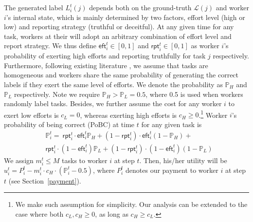 The generated label $L^{t}_{i}(j)$ depends both on the ground-truth $\mathcal{L}(j)$ and worker $i$'s internal state, which is mainly determined by two factors, effort level (high or low) and reporting strategy (truthful or deceitful).
At any given time for any task, workers at their will adopt an arbitrary combination of effort level and report strategy. We thus define $\textsf{eft}^{t}_i\in[0,1]$ and $\textsf{rpt}^{t}_i\in[0,1]$ as worker $i$'s probability of exerting high efforts and reporting truthfully for task $j$ %
respectively. Furthermore, following existing literature \citet{dasgupta2013crowdsourced,liu2017sequential}, we assume that tasks are homogeneous and workers share the same probability of generating the correct labels if they exert the same level of efforts. We denote the probability as $\mathbb{P}_{H}$ and $\mathbb{P}_{L}$ respectively. Note we require $\mathbb{P}_{H} > \mathbb{P}_{L} = 0.5$, where 0.5 is used when workers randomly label tasks.
Besides, we further assume the cost for any worker $i$ to exert low efforts is $c_{L} = 0$, whereas exerting high efforts is $c_{H} \geq 0$.\footnote{We make such assumption for simplicity. Our analysis can be extended to the case where both $c_{L},  c_{H} \geq 0$, as long as $c_{H} \geq c_{L}$.}
Worker $i$'s probability of being correct (PoBC) at time $t$ for any given task is 
\begin{equation}
\begin{split}
&\mathbb{P}^{t}_i  = ~\textsf{rpt}^{t}_i \cdot\textsf{eft}^{t}_i \mathbb{P}_{H}+ (1-\textsf{rpt}^{t}_i)\cdot \textsf{eft}^{t}_i (1-\mathbb{P}_{ H})+\\
&\textsf{rpt}^{t}_i \cdot(1-\textsf{eft}^{t}_i) \mathbb{P}_{L}+(1-\textsf{rpt}^{t}_i) \cdot(1-\textsf{eft}^{t}_i) (1-\mathbb{P}_{L})
\end{split}
\end{equation}
We assign $m^{t}_i\leq M$ tasks to worker $i$ at step $t$. Then, his/her utility will be $u_i^t=P_i^t - m^{t}_i \cdot c_H\cdot (\mathbb{P}_i^t-0.5)$, where $P^{t}_{i}$ denotes our payment to worker $i$ at step $t$ (see Section~\ref{payment}).

 

